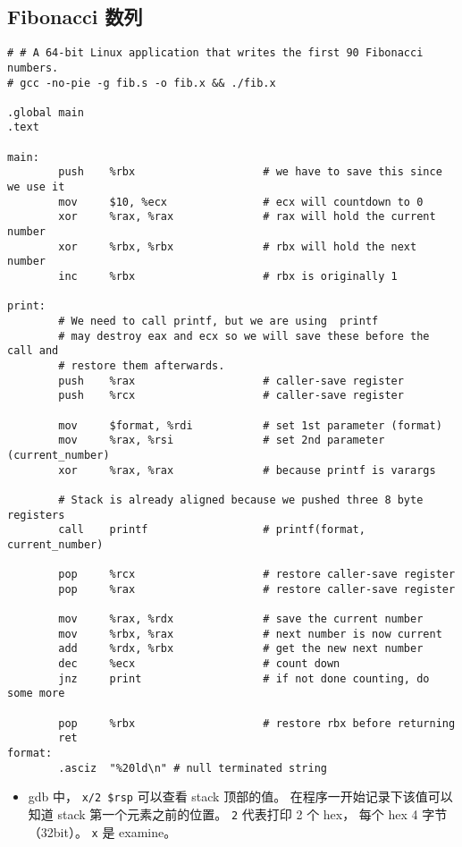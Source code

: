 \subsection{Fibonacci 数列}
\begin{lstlisting}[language=none, caption=fib.s]
# # A 64-bit Linux application that writes the first 90 Fibonacci numbers.
# gcc -no-pie -g fib.s -o fib.x && ./fib.x

.global main
.text

main:
        push    %rbx                    # we have to save this since we use it
        mov     $10, %ecx               # ecx will countdown to 0
        xor     %rax, %rax              # rax will hold the current number
        xor     %rbx, %rbx              # rbx will hold the next number
        inc     %rbx                    # rbx is originally 1

print:
        # We need to call printf, but we are using  printf
        # may destroy eax and ecx so we will save these before the call and
        # restore them afterwards.
        push    %rax                    # caller-save register
        push    %rcx                    # caller-save register

        mov     $format, %rdi           # set 1st parameter (format)
        mov     %rax, %rsi              # set 2nd parameter (current_number)
        xor     %rax, %rax              # because printf is varargs

        # Stack is already aligned because we pushed three 8 byte registers
        call    printf                  # printf(format, current_number)

        pop     %rcx                    # restore caller-save register
        pop     %rax                    # restore caller-save register

        mov     %rax, %rdx              # save the current number
        mov     %rbx, %rax              # next number is now current
        add     %rdx, %rbx              # get the new next number
        dec     %ecx                    # count down
        jnz     print                   # if not done counting, do some more

        pop     %rbx                    # restore rbx before returning
        ret
format:
        .asciz  "%20ld\n" # null terminated string
\end{lstlisting}

\begin{itemize}
\item gdb 中， \verb|x/2 $rsp| 可以查看 stack 顶部的值。 在程序一开始记录下该值可以知道 stack 第一个元素之前的位置。 \verb|2| 代表打印 2 个 hex， 每个 hex 4 字节（32bit）。 \verb|x| 是 examine。
\end{itemize}
